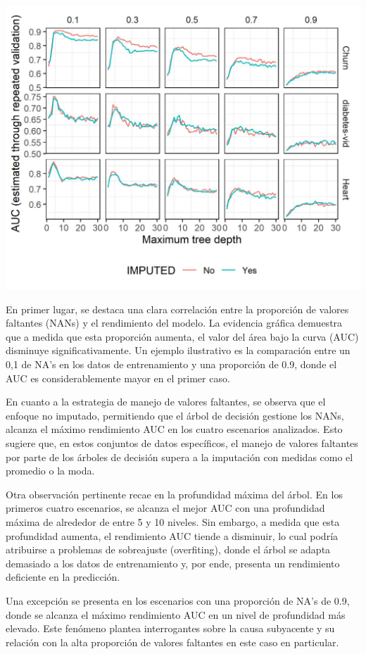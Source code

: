 \documentclass[
]{article}
\begin{document}
\includegraphics{outputs/plots/plot_exp_1.jpg}

En primer lugar, se destaca una clara correlación entre la proporción de
valores faltantes (NANs) y el rendimiento del modelo. La evidencia
gráfica demuestra que a medida que esta proporción aumenta, el valor del
área bajo la curva (AUC) disminuye significativamente. Un ejemplo
ilustrativo es la comparación entre un 0,1 de NA's en los datos de
entrenamiento y una proporción de 0.9, donde el AUC es considerablemente
mayor en el primer caso.

En cuanto a la estrategia de manejo de valores faltantes, se observa que
el enfoque no imputado, permitiendo que el árbol de decisión gestione
los NANs, alcanza el máximo rendimiento AUC en los cuatro escenarios
analizados. Esto sugiere que, en estos conjuntos de datos específicos,
el manejo de valores faltantes por parte de los árboles de decisión
supera a la imputación con medidas como el promedio o la moda.

Otra observación pertinente recae en la profundidad máxima del árbol. En
los primeros cuatro escenarios, se alcanza el mejor AUC con una
profundidad máxima de alrededor de entre 5 y 10 niveles. Sin embargo, a
medida que esta profundidad aumenta, el rendimiento AUC tiende a
disminuir, lo cual podría atribuirse a problemas de sobreajuste
(overfiting), donde el árbol se adapta demasiado a los datos de
entrenamiento y, por ende, presenta un rendimiento deficiente en la
predicción.

Una excepción se presenta en los escenarios con una proporción de NA's
de 0.9, donde se alcanza el máximo rendimiento AUC en un nivel de
profundidad más elevado. Este fenómeno plantea interrogantes sobre la
causa subyacente y su relación con la alta proporción de valores
faltantes en este caso en particular.
\end{document}
